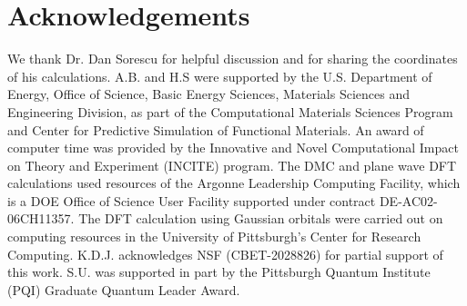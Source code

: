 \section{Acknowledgements}
We thank Dr. Dan Sorescu for helpful discussion and for sharing the coordinates of his calculations.
A.B. and H.S were supported by the U.S. Department of Energy, Office of Science, Basic Energy Sciences, Materials Sciences and Engineering Division, as part of the Computational Materials Sciences Program and Center for Predictive Simulation of Functional Materials.
An award of computer time was provided by the Innovative and Novel Computational Impact on Theory and Experiment (INCITE) program.
The DMC and plane wave DFT calculations used resources of the Argonne Leadership Computing Facility, which is a DOE Office of Science User Facility supported under contract DE-AC02-06CH11357. The DFT calculation using Gaussian orbitals were carried out on computing resources in the University of Pittsburgh's Center for Research Computing. K.D.J. acknowledges NSF (CBET-2028826) for partial support of this work. S.U. was supported in part by the Pittsburgh Quantum Institute (PQI) Graduate Quantum Leader Award.
